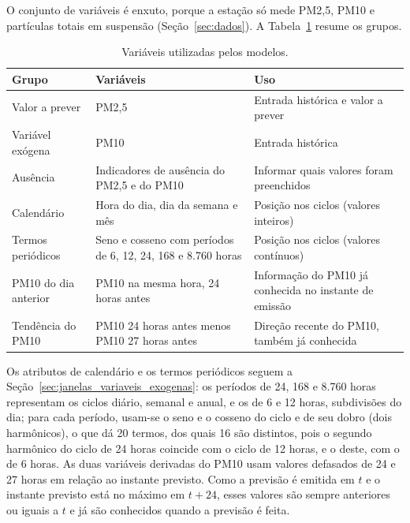 O conjunto de variáveis é enxuto, porque a estação só mede PM2,5, PM10 e partículas totais em suspensão (Seção~\ref{sec:dados}). A Tabela~\ref{tab:variaveis_contrato} resume os grupos.

\begin{table}[htbp]
    \centering
    \caption{Variáveis utilizadas pelos modelos.}
    \label{tab:variaveis_contrato}
    \small
    \begin{tabular}{>{\raggedright\arraybackslash}p{}>{\raggedright\arraybackslash}p{}>{\raggedright\arraybackslash}p{}}
        \toprule
        \textbf{Grupo} & \textbf{Variáveis} & \textbf{Uso} \\
        \midrule
        Valor a prever & PM2,5 & Entrada histórica e valor a prever \\
        Variável exógena & PM10 & Entrada histórica \\
        Ausência & Indicadores de ausência do PM2,5 e do PM10 & Informar quais valores foram preenchidos \\
        Calendário & Hora do dia, dia da semana e mês & Posição nos ciclos (valores inteiros) \\
        Termos periódicos & Seno e cosseno com períodos de 6, 12, 24, 168 e 8.760 horas & Posição nos ciclos (valores contínuos) \\
        PM10 do dia anterior & PM10 na mesma hora, 24 horas antes & Informação do PM10 já conhecida no instante de emissão \\
        Tendência do PM10 & PM10 24 horas antes menos PM10 27 horas antes & Direção recente do PM10, também já conhecida \\
        \bottomrule
    \end{tabular}
\end{table}

Os atributos de calendário e os termos periódicos seguem a Seção~\ref{sec:janelas_variaveis_exogenas}: os períodos de 24, 168 e 8.760 horas representam os ciclos diário, semanal e anual, e os de 6 e 12 horas, subdivisões do dia; para cada período, usam-se o seno e o cosseno do ciclo e de seu dobro (dois harmônicos), o que dá 20 termos, dos quais 16 são distintos, pois o segundo harmônico do ciclo de 24 horas coincide com o ciclo de 12 horas, e o deste, com o de 6 horas. As duas variáveis derivadas do PM10 usam valores defasados de 24 e 27 horas em relação ao instante previsto. Como a previsão é emitida em \(t\) e o instante previsto está no máximo em \(t+24\), esses valores são sempre anteriores ou iguais a \(t\) e já são conhecidos quando a previsão é feita.

